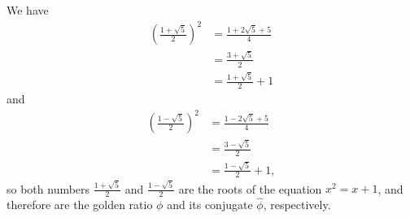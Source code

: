 
\noindent We have
\begin{align*}
    \left(\frac{1+\sqrt{5}}{2}\right)^2 &= \frac{1+2\sqrt{5}+5}{4} \\
    &= \frac{3+\sqrt{5}}{2} \\[1mm]
    &= \frac{1+\sqrt{5}}{2}+1
\end{align*}
and
\begin{align*}
    \left(\frac{1-\sqrt{5}}{2}\right)^2 &= \frac{1-2\sqrt{5}+5}{4} \\
    &= \frac{3-\sqrt{5}}{2} \\[1mm]
    &= \frac{1-\sqrt{5}}{2}+1,
\end{align*}
so both numbers $\frac{1+\sqrt{5}}{2}$ and $\frac{1-\sqrt{5}}{2}$ are the roots of the equation $x^2=x+1$, and therefore are the golden ratio $\phi$ and its conjugate $\widehat\phi$, respectively.
